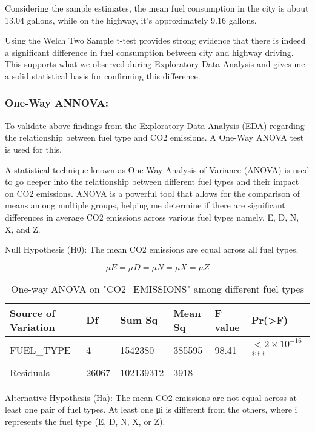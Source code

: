 \documentclass[12pt, a4paper,oneside]{book}
\numberwithin{equation}{section}
\begin{document}
Considering the sample estimates, the mean fuel consumption in the city is about 13.04 gallons, while on the highway, it's approximately 9.16 gallons.


Using the Welch Two Sample t-test provides strong evidence that there is indeed a significant difference in fuel consumption between city and highway driving. This supports what we observed during  Exploratory Data Analysis and gives me a solid statistical basis for confirming this difference.


\newpage
\subsubsection{One-Way ANNOVA:}

To validate above findings from the Exploratory Data Analysis (EDA) regarding the relationship between fuel type and CO2 emissions. A One-Way ANOVA test is used for this.

A statistical technique known as One-Way Analysis of Variance (ANOVA) is used to go deeper into the relationship between different fuel types and their impact on CO2 emissions. ANOVA is a powerful tool that allows for the comparison of means among multiple groups, helping me determine if there are significant differences in average CO2 emissions across various fuel types namely, E, D, N, X, and Z.~\cite{ref10}



Null Hypothesis (H0): The mean CO2 emissions are equal across all fuel types.

\begin{equation}
   \mu E=\mu D=\mu N=\mu X=\mu Z 
\end{equation}



\begin{table}[h]
\centering
\caption{One-way ANOVA on "CO2\_EMISSIONS" among different fuel types}
\begin{tabular}{llllll}
\textbf{Source of Variation} & \textbf{Df} & \textbf{Sum Sq} & \textbf{Mean Sq} & \textbf{F value} & \textbf{Pr(>F)} \\
\hline
FUEL\_TYPE & 4 & 1542380 & 385595 & 98.41 & $<2 \times 10^{-16}$ *** \\
Residuals & 26067 & 102139312 & 3918 & & \\
\hline
\end{tabular}
\end{table}


Alternative Hypothesis (Ha): The mean CO2 emissions are not equal across at least one pair of fuel types.
At least one μi is different from the others, where i represents the fuel type (E, D, N, X, or Z).
\end{document}
